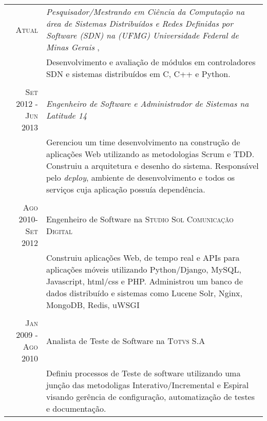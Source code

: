 \documentclass[a4paper,10pt]{article} %
\begin{document}
\begin{tabular}{r|p{11cm}}

\textsc{Atual} & \emph{ Pesquisador/Mestrando em Ciência da Computação na
área de Sistemas Distribuídos e Redes Definidas por Software (SDN)
na (UFMG) Universidade Federal de Minas Gerais }, \\
& \footnotesize{Desenvolvimento e avaliação de módulos em controladores SDN
e sistemas distribuídos em C, C++ e Python.} \\
\multicolumn{2}{c}{} \\

\textsc{Set 2012 - Jun 2013} & \emph{Engenheiro de Software e Administrador
de Sistemas na Latitude 14} \\
& \footnotesize{Gerenciou um time desenvolvimento na construção de
aplicações Web utilizando as metodologias Scrum e TDD.
Construiu a arquitetura e desenho do sistema.
Responsável pelo \emph{deploy}, ambiente de desenvolvimento e todos
os serviços cuja aplicação possuía dependência. } \\
\multicolumn{2}{c}{} \\


\textsc{Ago 2010-Set 2012} & Engenheiro de Software na \textsc{Studio Sol
Comunicação Digital}  \\
& \footnotesize{Construiu aplicações Web, de tempo real e
APIs para aplicações móveis utilizando Python/Django, MySQL,
Javascript, html/css e PHP.
Administrou um banco de dados distribuído e sistemas como
Lucene Solr, Nginx, MongoDB, Redis, uWSGI}\\
\multicolumn{2}{c}{} \\


\textsc{Jan 2009 - Ago 2010} & Analista de Teste de Software
na \textsc{Totvs S.A} \\
& \footnotesize{Definiu processos de Teste de software utilizando uma
junção das metodoligas Interativo/Incremental e Espiral visando
gerência de configuração, automatização de testes e documentação.}
\end{tabular}




\end{document}
